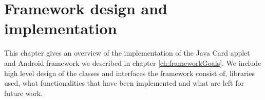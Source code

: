 \chapter{Framework design and implementation}
This chapter gives an overview of the implementation of the Java Card applet and Android framework we described in chapter \ref{ch:frameworkGoals}. We include high level design of the classes and interfaces the framework consist of, libraries used, what functionalities that have been implemented and what are left for future work. 



